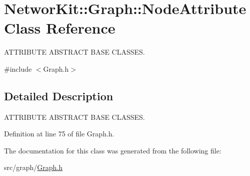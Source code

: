 \hypertarget{class_networ_kit_1_1_graph_1_1_node_attribute}{\section{Networ\-Kit\-:\-:Graph\-:\-:Node\-Attribute Class Reference}
\label{class_networ_kit_1_1_graph_1_1_node_attribute}
}


A\-T\-T\-R\-I\-B\-U\-T\-E A\-B\-S\-T\-R\-A\-C\-T B\-A\-S\-E C\-L\-A\-S\-S\-E\-S.  




{\ttfamily \#include $<$Graph.\-h$>$}



\subsection{Detailed Description}
A\-T\-T\-R\-I\-B\-U\-T\-E A\-B\-S\-T\-R\-A\-C\-T B\-A\-S\-E C\-L\-A\-S\-S\-E\-S. 

Definition at line 75 of file Graph.\-h.



The documentation for this class was generated from the following file\-:\begin{DoxyCompactItemize}
\item 
src/graph/\hyperlink{_graph_8h}{Graph.\-h}\end{DoxyCompactItemize}

